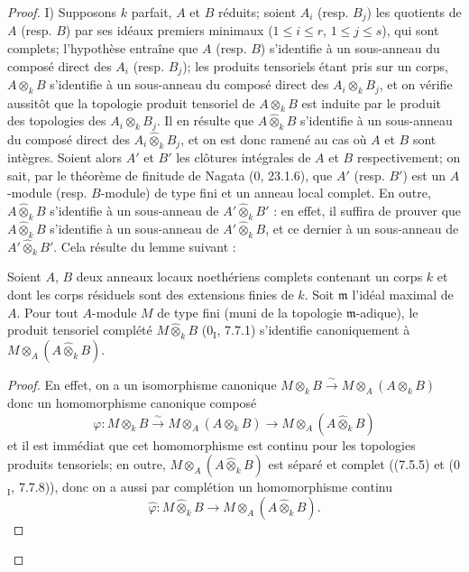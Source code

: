 \begin{proof}
I) Supposons $k$ parfait, $A$ et $B$ réduits; soient $A_i$ (resp. $B_j$) les
quotients de $A$ (resp. $B$) par ses idéaux premiers minimaux
($1\leq i\leq r$, $1\leq j\leq s$), qui sont complets; l'hypothèse entraîne
que $A$ (resp. $B$) s'identifie à un sous-anneau du composé direct des $A_i$
(resp. $B_j$); les produits tensoriels étant pris sur un corps,
$A\otimes_kB$ s'identifie à un sous-anneau du composé direct des
$A_i\otimes_kB_j$, et on vérifie aussitôt que la topologie produit tensoriel
de $A\otimes_kB$ est induite par le produit des topologies des
$A_i\otimes_kB_j$. Il en résulte que $A\widehat\otimes_kB$ s'identifie à un
sous-anneau du composé direct des $A_i\widehat\otimes_kB_j$, et on est donc
ramené au cas où $A$ et $B$ sont intègres. Soient alors $A'$ et $B'$ les
clôtures intégrales de $A$ et $B$ respectivement; on sait, par le théorème de
finitude de Nagata (0, 23.1.6), que $A'$ (resp. $B'$) est un $A$-module (resp.
$B$-module) de type fini et un anneau local complet. En outre,
$A\widehat\otimes_kB$ s'identifie à un sous-anneau de
$A'\widehat\otimes_kB'$ : en effet, il suffira de prouver que
$A\widehat\otimes_kB$ s'identifie à un sous-anneau de
$A'\widehat\otimes_kB$, et ce dernier à un sous-anneau de
$A'\widehat\otimes_kB'$. Cela résulte du lemme suivant :

\begin{lemma}[7.5.7.1]
\label{IV.2.s7.5.7.1-fr}
Soient $A$, $B$ deux anneaux locaux noethériens complets contenant un corps
$k$ et dont les corps résiduels sont des extensions finies de $k$. Soit
$\mathfrak m$ l'idéal maximal de $A$. Pour tout $A$-module $M$ de type fini
(muni de la topologie $\mathfrak m$-adique), le produit tensoriel complété
$M\widehat\otimes_kB$ (0$_{\mathrm I}$, 7.7.1) s'identifie canoniquement à
$M\otimes_A(A\widehat\otimes_kB)$.
\end{lemma}

\begin{proof}
En effet, on a un isomorphisme canonique
$M\otimes_kB\xrightarrow{\sim}M\otimes_A(A\otimes_kB)$ donc un homomorphisme
canonique composé
\[
\varphi:M\otimes_kB\xrightarrow{\sim}M\otimes_A(A\otimes_kB)
\longrightarrow M\otimes_A(A\widehat\otimes_kB)
\]
et il est immédiat que cet homomorphisme est continu pour les topologies
produits tensoriels; en outre, $M\otimes_A(A\widehat\otimes_kB)$ est séparé et
complet ((7.5.5) et (0$_{\mathrm I}$, 7.7.8)), donc on a aussi par complétion
un homomorphisme continu
\[
\widehat\varphi:M\widehat\otimes_kB\longrightarrow
M\otimes_A(A\widehat\otimes_kB).
\]


\end{proof}
\end{proof}
